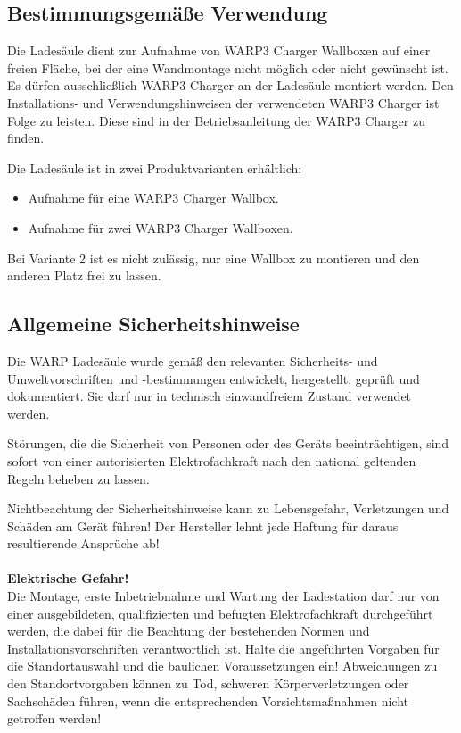 \documentclass[a4paper,10pt]{article}
\newcommand{\warn}[1]{\begin{tcolorbox}[colback=boxred,colframe=red,coltext=
white,title=Warnung]#1\end{tcolorbox}}
\begin{document}
\begin{multicols*}{2}
	\subsection{Bestimmungsgemäße Verwendung}
	Die Ladesäule dient zur Aufnahme von WARP3 Charger Wallboxen auf einer freien
	Fläche, bei der eine Wandmontage nicht möglich oder nicht gewünscht ist. 
	Es dürfen ausschließlich WARP3 Charger
	an der Ladesäule montiert werden. Den Installations- und
	Verwendungshinweisen der verwendeten WARP3 Charger ist Folge zu leisten.
	Diese sind in der Betriebsanleitung der WARP3 Charger zu finden.

	Die Ladesäule ist in zwei Produktvarianten erhältlich:
	\begin{itemize}
		\item Aufnahme für eine WARP3 Charger Wallbox.
		\item Aufnahme für zwei WARP3 Charger Wallboxen.
	\end{itemize}

	Bei Variante 2 ist es nicht zulässig, nur eine Wallbox zu montieren und den anderen Platz frei zu lassen.
\vspace{-0.2cm}
	\subsection{Allgemeine Sicherheitshinweise}

	Die WARP Ladesäule wurde gemäß den relevanten Sicherheits- und Umweltvorschriften und -bestimmungen
	entwickelt, hergestellt, geprüft und dokumentiert. Sie darf nur in technisch einwandfreiem Zustand verwendet werden.

	Störungen, die die Sicherheit von Personen oder des Geräts beeinträchtigen,
	sind sofort von einer autorisierten Elektrofachkraft nach den national geltenden Regeln beheben zu lassen.

	\warn{Nichtbeachtung der Sicherheitshinweise kann zu Lebensgefahr,
	Verletzungen und Schäden am Gerät führen! Der Hersteller lehnt jede Haftung
	für daraus resultierende Ansprüche ab!
	\\
	\\
	\textbf{Elektrische Gefahr!}\\
	Die Montage, erste Inbetriebnahme und Wartung der Ladestation darf nur von
	einer ausgebildeten, qualifizierten und befugten Elektrofachkraft
	durchgeführt werden, die dabei für die Beachtung der bestehenden Normen und
	Installationsvorschriften verantwortlich ist. Halte die angeführten Vorgaben 
	für die Standortauswahl und die baulichen Voraussetzungen ein! Abweichungen 
	zu den Standortvorgaben können zu Tod, schweren Körperverletzungen oder 
	Sachschäden führen, wenn die entsprechenden Vorsichtsmaßnahmen nicht 
	getroffen werden!
	}


\end{multicols*}
\end{document}
